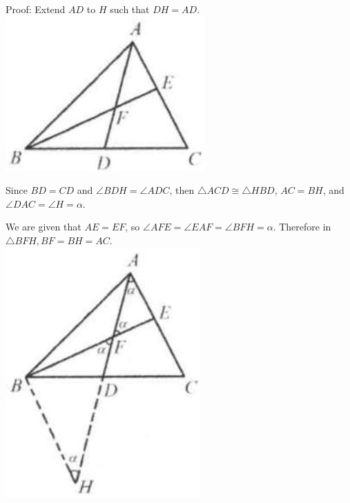 \documentclass[10pt]{article}
\begin{document}
Proof:
Extend \(A D\) to \(H\) such that \(D H=A D\).\\
\includegraphics[max width=\textwidth, center]{2025_04_17_97bc1f7e44d93c271a88g-026}

Since \(B D=C D\) and \(\angle B D H=\angle A D C\), then \(\triangle A C D \cong \triangle H B D\), \(A C=B H\), and \(\angle D A C=\angle H=\alpha\).

We are given that \(A E=E F\), so \(\angle A F E=\angle E A F=\angle B F H=\alpha\). Therefore in \(\triangle B F H, B F=B H=A C\).\\
\includegraphics[max width=\textwidth, center]{2025_04_17_97bc1f7e44d93c271a88g-026(1)}
\end{document}
